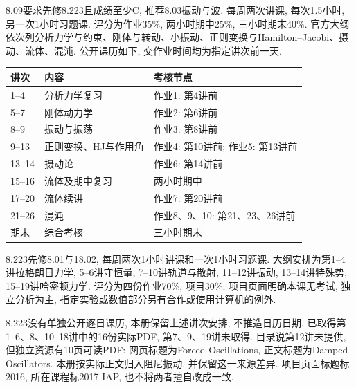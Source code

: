 \par{}\par
8.09要求先修8.223且成绩至少C, 推荐8.03振动与波. 每周两次讲课, 每次1.5小时, 另一次1小时习题课. 评分为作业35\%, 两小时期中25\%, 三小时期末40\%. 官方大纲依次列分析力学与约束、刚体与转动、小振动、正则变换与Hamilton--Jacobi、摄动、流体、混沌. 公开课历如下, 交作业时间均为指定讲次前一天.
\begin{longtable}{p{}p{}p{}}
\toprule 讲次 & 内容 & 考核节点\\\midrule
1--4 & 分析力学复习 & 作业1: 第4讲前\\
5--7 & 刚体动力学 & 作业2: 第6讲前\\
8--9 & 振动与振荡 & 作业3: 第8讲前\\
9--13 & 正则变换、HJ与作用角 & 作业4: 第10讲前; 作业5: 第13讲前\\
13--14 & 摄动论 & 作业6: 第14讲前\\
15--16 & 流体及期中复习 & 两小时期中\\
17--20 & 流体续讲 & 作业7: 第20讲前\\
21--26 & 混沌 & 作业8、9、10: 第21、23、26讲前\\
期末 & 综合考核 & 三小时期末\\\bottomrule
\end{longtable}
8.223先修8.01与18.02, 每周两次1小时讲课和一次1小时习题课. 大纲安排为第1--4讲拉格朗日力学, 5--6讲守恒量, 7--10讲轨道与散射, 11--12讲振动, 13--14讲特殊势, 15--19讲哈密顿力学. 评分为四份作业70\%, 项目30\%; 项目页面明确本课无考试, 独立分析为主, 指定实验或数值部分另有合作或使用计算机的例外.

8.223没有单独公开逐日课历, 本册保留上述讲次安排, 不推造日历日期. 已取得第1--6、8、10--18讲中的16份实际PDF, 第7、9、19讲未取得. 目录说第12讲未提供, 但独立资源有10页可读PDF: 网页标题为Forced Oscillations, 正文标题为Damped Oscillators. 本册按实际正文归入阻尼振动, 并保留这一来源差异. 项目页面标题标2016, 所在课程标2017 IAP, 也不将两者擅自改成一致.
